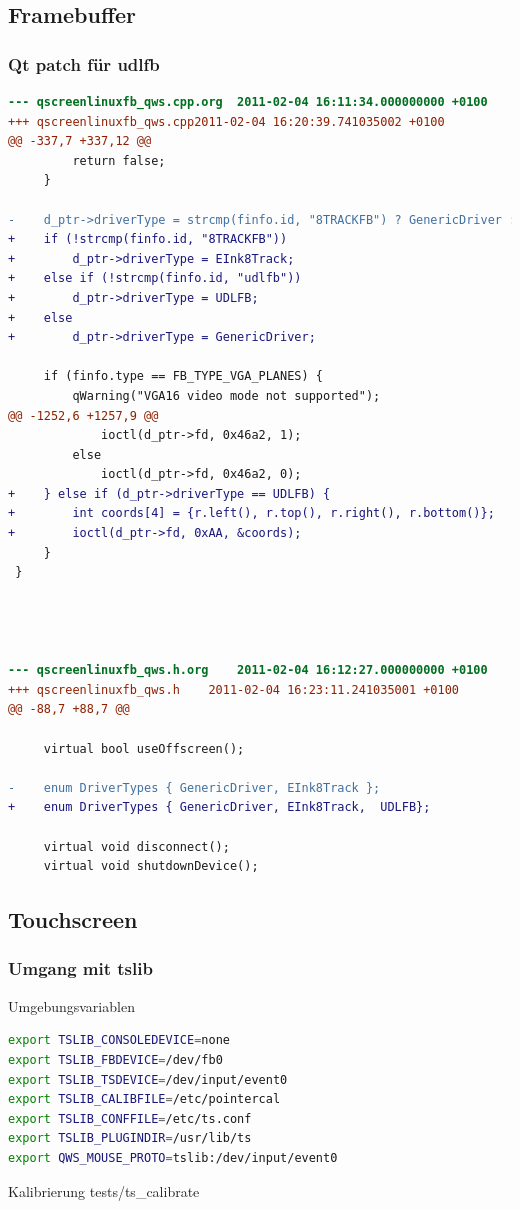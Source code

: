 \documentclass{beamer}
\begin{document}
  \subsection{Framebuffer}
	\begin{frame}
		\frametitle{Qt patch für udlfb}
		\begin{lstlisting}[language=diff, basicstyle=\tiny]
--- qscreenlinuxfb_qws.cpp.org	2011-02-04 16:11:34.000000000 +0100
+++ qscreenlinuxfb_qws.cpp2011-02-04 16:20:39.741035002 +0100
@@ -337,7 +337,12 @@
         return false;
     }
 
-    d_ptr->driverType = strcmp(finfo.id, "8TRACKFB") ? GenericDriver : EInk8Track;
+    if (!strcmp(finfo.id, "8TRACKFB"))
+        d_ptr->driverType = EInk8Track;
+    else if (!strcmp(finfo.id, "udlfb"))
+        d_ptr->driverType = UDLFB;
+    else
+        d_ptr->driverType = GenericDriver;
 
     if (finfo.type == FB_TYPE_VGA_PLANES) {
         qWarning("VGA16 video mode not supported");
@@ -1252,6 +1257,9 @@
             ioctl(d_ptr->fd, 0x46a2, 1);
         else
             ioctl(d_ptr->fd, 0x46a2, 0);
+    } else if (d_ptr->driverType == UDLFB) {
+        int coords[4] = {r.left(), r.top(), r.right(), r.bottom()};
+        ioctl(d_ptr->fd, 0xAA, &coords);
     }
 }



 
--- qscreenlinuxfb_qws.h.org	2011-02-04 16:12:27.000000000 +0100
+++ qscreenlinuxfb_qws.h	2011-02-04 16:23:11.241035001 +0100
@@ -88,7 +88,7 @@
 
     virtual bool useOffscreen();
 
-    enum DriverTypes { GenericDriver, EInk8Track };
+    enum DriverTypes { GenericDriver, EInk8Track,  UDLFB};
 
     virtual void disconnect();
     virtual void shutdownDevice();	
		\end{lstlisting}
	\end{frame}

  \subsection{Touchscreen}
	\begin{frame}
    \frametitle{Umgang mit tslib}
    \begin{block}{Umgebungsvariablen}
      \begin{lstlisting}[language=Bash]
export TSLIB_CONSOLEDEVICE=none
export TSLIB_FBDEVICE=/dev/fb0
export TSLIB_TSDEVICE=/dev/input/event0
export TSLIB_CALIBFILE=/etc/pointercal
export TSLIB_CONFFILE=/etc/ts.conf
export TSLIB_PLUGINDIR=/usr/lib/ts
export QWS_MOUSE_PROTO=tslib:/dev/input/event0
      \end{lstlisting}
    \end{block}
    \begin{block}{Kalibrierung}
tests/ts\_calibrate
    \end{block}
  \end{frame}
\end{document}
